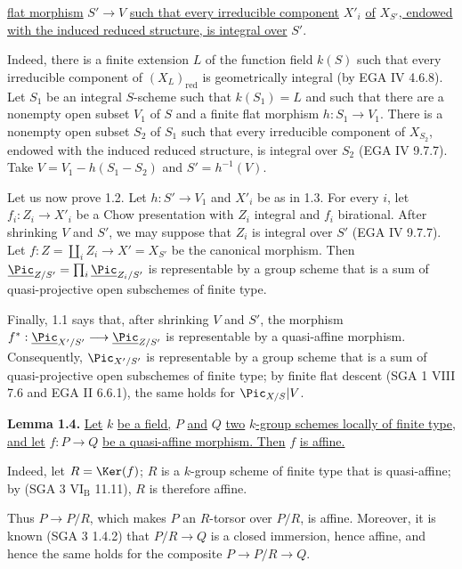 %
\uline{flat morphism} \(S'\to V\) \uline{such that every irreducible component} \(X'_i\) \uline{of} \(X_{S'}\)\uline{, endowed with the induced reduced structure, is integral over} \(S'\).

Indeed, there is a finite extension \(L\) of the function field \(k(S)\) such that every irreducible component of \((X_L)_{\text{red}}\) is geometrically integral (by EGA IV 4.6.8). Let \(S_1\) be an integral \(S\)-scheme such that \(k(S_1)=L\) and such that there are a nonempty open subset \(V_1\) of \(S\) and a finite flat morphism \(h:S_1\to V_1\). There is a nonempty open subset \(S_2\) of \(S_1\) such that every irreducible component of \(X_{S_2}\), endowed with the induced reduced structure, is integral over \(S_2\) (EGA IV 9.7.7). Take \(V=V_1-h(S_1-S_2)\) and \(S'=h^{-1}(V)\).

Let us now prove 1.2. Let \(h:S'\to V_1\) and \(X'_i\) be as in 1.3. For every \(i\), let \(f_i:Z_i\to X'_i\) be a Chow presentation with \(Z_i\) integral and \(f_i\) birational. After shrinking \(V\) and \(S'\), we may suppose that \(Z_i\) is integral over \(S'\) (EGA IV 9.7.7). Let \(f:Z=\coprod_i Z_i\longrightarrow X'=X_{S'}\) be the canonical morphism. Then \(\underline{\Pic}_{Z/S'}=\prod_i\underline{\Pic}_{Z_i/S'}\) is representable by a group scheme that is a sum of quasi-projective open subschemes of finite type.

Finally, 1.1 says that, after shrinking \(V\) and \(S'\), the morphism \(f^*:\underline{\Pic}_{X'/S'}\longrightarrow \underline{\Pic}_{Z/S'}\) is representable by a quasi-affine morphism. Consequently, \(\Pic_{X'/S'}\) is representable by a group scheme that is a sum of quasi-projective open subschemes of finite type; by finite flat descent (SGA 1 VIII 7.6 and EGA II 6.6.1), the same holds for \(\Pic_{X/S}|V\).

\textbf{Lemma 1.4.} \uline{Let} \(k\) \uline{be a field,} \(P\) \uline{and} \(Q\) \uline{two} \(k\)\uline{-group schemes locally of finite type, and let} \(f:P\to Q\) \uline{be a quasi-affine morphism. Then} \(f\) \uline{is affine.}

Indeed, let \(R=\Ker(f)\); \(R\) is a \(k\)-group scheme of finite type that is quasi-affine; by (SGA 3 \(\mathrm{VI}_{\mathrm B}\) 11.11), \(R\) is therefore affine.


%
Thus \(P\to P/R\), which makes \(P\) an \(R\)-torsor over \(P/R\), is affine. Moreover, it is known (SGA 3 1.4.2) that \(P/R\to Q\) is a closed immersion, hence affine, and hence the same holds for the composite \(P\to P/R\to Q\).

